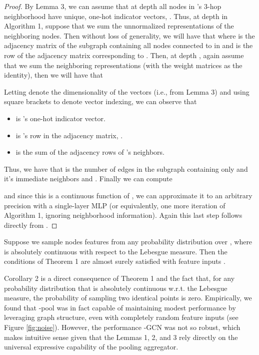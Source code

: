 \begin{proof}
By Lemma 3, we can assume that at depth  all nodes in 's 3-hop neighborhood have unique, one-hot indicator vectors, . 
Thus, at depth  in Algorithm 1, suppose that we sum the unnormalized representations of the neighboring nodes. Then without loss of generality, we will have that  where  is the adjacency matrix of the subgraph containing all nodes connected to  in  and  is the row of the adjacency matrix corresponding to . 
Then, at depth , again assume that we sum the neighboring representations (with the weight matrices as the identity), then we will have that 

Letting  denote the dimensionality of the  vectors (i.e.,  from Lemma 3) and using square brackets to denote vector indexing, we can observe that
\begin{itemize}
\item
	 is 's one-hot indicator vector. 
\item
	 is 's row in the adjacency matrix, .
\item
	 is the sum of the adjacency rows of 's neighbors. 
\end{itemize}

Thus, we have that  is the number of edges in the subgraph containing only  and it's immediate neighbors and .
Finally we can compute

and since this is a continuous function of , we can approximate it to an arbitrary  precision with a single-layer MLP (or equivalently, one more iteration of Algorithm 1, ignoring neighborhood information). 
Again this last step follows directly from \cite{hornik1991approximation}.
\end{proof}

\renewcommand{\thetheorem}{2}
\begin{corollary}
Suppose we sample nodes features from any probability distribution  over , where  is absolutely continuous with respect to the Lebesgue measure. Then the conditions of Theorem 1 are almost surely satisfied with feature inputs . 
\end{corollary}

Corollary 2 is a direct consequence of Theorem 1 and the fact that, for any probability distribution that is absolutely continuous w.r.t. the Lebesgue measure, the probability of sampling two identical points is zero. 
Empirically, we found that \name-pool was in fact capable of maintaining modest performance by leveraging graph structure, even with completely random feature inputs (see Figure \ref{fig:noise}).
However, the performance \name-GCN was not so robust, which makes intuitive sense given that the Lemmas 1, 2, and 3 rely directly on the universal expressive capability of the pooling aggregator. 

